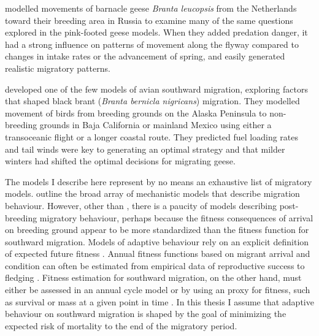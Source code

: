 \citet{Jonker2010} modelled movements of barnacle geese \textit{Branta leucopsis} from the Netherlands toward their breeding area in Russia to examine many of the same questions explored in the pink-footed geese models. When they added predation danger, it had a strong influence on patterns of movement along the flyway compared to changes in intake rates or the advancement of spring, and easily generated realistic migratory patterns. 

\citet{brantModel2007} developed one of the few models of avian southward migration, exploring factors that shaped black brant (\textit{Branta bernicla nigricans}) migration. They modelled movement of birds from breeding grounds on the Alaska Peninsula to non-breeding grounds in Baja California or mainland Mexico using either a transoceanic flight or a longer coastal route. They predicted fuel loading rates and tail winds were key to generating an optimal strategy and that milder winters had shifted the optimal decisions for migrating geese.

The models I describe here represent by no means an exhaustive list of migratory models. \citet{Bauer2013} outline the broad array of mechanistic models that describe migration behaviour. However, other than \citet{brantModel2007}, there is a paucity of models describing post-breeding migratory behaviour, perhaps because the fitness consequences of arrival on breeding ground appear to be more standardized than the fitness function for southward migration. Models of adaptive behaviour rely on an explicit definition of expected future fitness \citep{houston1999models}.  Annual fitness functions based on migrant arrival and condition can often be estimated from empirical data of reproductive success to fledging \citep{Lameris2017}. Fitness estimation for southward migration, on the other hand, must either be assessed in an annual cycle model or by using an proxy for fitness, such as survival or mass at a given point in time \citep{Weber1999a,Alves2013a}. In this thesis I assume that adaptive behaviour on southward migration is shaped by the goal of minimizing the expected risk of mortality to the end of the migratory period.





